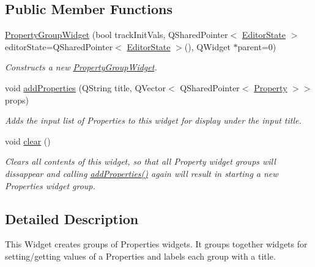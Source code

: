 \subsection*{Public Member Functions}
\begin{DoxyCompactItemize}
\item 
\hyperlink{class_property_group_widget_ad4a12a848e83c45dec78046f48e4040e}{Property\-Group\-Widget} (bool track\-Init\-Vals, Q\-Shared\-Pointer$<$ \hyperlink{class_editor_state}{Editor\-State} $>$ editor\-State=Q\-Shared\-Pointer$<$ \hyperlink{class_editor_state}{Editor\-State} $>$(), Q\-Widget $\ast$parent=0)
\begin{DoxyCompactList}\small\item\em Constructs a new \hyperlink{class_property_group_widget}{Property\-Group\-Widget}. \end{DoxyCompactList}\item 
void \hyperlink{class_property_group_widget_a831d648fc9f9493ff0257de54b6c3353}{add\-Properties} (Q\-String title, Q\-Vector$<$ Q\-Shared\-Pointer$<$ \hyperlink{class_picto_1_1_property}{Property} $>$$>$ props)
\begin{DoxyCompactList}\small\item\em Adds the input list of Properties to this widget for display under the input title. \end{DoxyCompactList}\item 
\hypertarget{class_property_group_widget_aed6f878c4651bf02b1f66a354a9e8ed0}{void \hyperlink{class_property_group_widget_aed6f878c4651bf02b1f66a354a9e8ed0}{clear} ()}\label{class_property_group_widget_aed6f878c4651bf02b1f66a354a9e8ed0}

\begin{DoxyCompactList}\small\item\em Clears all contents of this widget, so that all Property widget groups will dissappear and calling \hyperlink{class_property_group_widget_a831d648fc9f9493ff0257de54b6c3353}{add\-Properties()} again will result in starting a new Properties widget group. \end{DoxyCompactList}\end{DoxyCompactItemize}


\subsection{Detailed Description}
This Widget creates groups of Properties widgets. It groups together widgets for setting/getting values of a Properties and labels each group with a title. 

